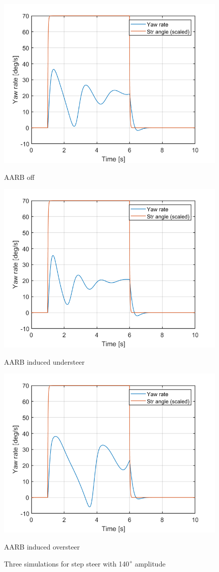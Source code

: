 \begin{figure}[H]
\begin{minipage}[b]{0.49\linewidth}
    \centering
    \includegraphics[width = \textwidth]{Figures/4_3_normal_140.png}
    \caption{AARB off}
\end{minipage}
\begin{minipage}[b]{0.49\linewidth}
    \centering
    \includegraphics[width = \textwidth]{Figures/4_3_understeer_140.png}
    \caption{AARB induced understeer}
\end{minipage}
\begin{minipage}[b]{\linewidth}
    \centering
    \includegraphics[width = 0.49 \textwidth]{Figures/4_3_oversteer_140.png}
    \caption{AARB induced oversteer}
\end{minipage}
\caption{Three simulations for step steer with 140$\degree$ amplitude}
\end{figure}

